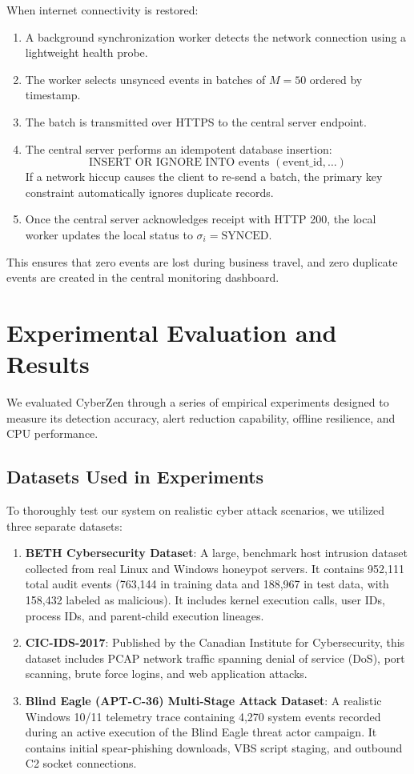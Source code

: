 \documentclass[conference]{IEEEtran}
\begin{document}
When internet connectivity is restored:
\begin{enumerate}
    \item A background synchronization worker detects the network connection using a lightweight health probe.
    \item The worker selects unsynced events in batches of $M=50$ ordered by timestamp.
    \item The batch is transmitted over HTTPS to the central server endpoint.
    \item The central server performs an idempotent database insertion:
    \begin{equation}
    \text{INSERT OR IGNORE INTO events } (\text{event\_id}, \dots)
    \end{equation}
    If a network hiccup causes the client to re-send a batch, the primary key constraint automatically ignores duplicate records.
    \item Once the central server acknowledges receipt with HTTP 200, the local worker updates the local status to $\sigma_i = \text{SYNCED}$.
\end{enumerate}
This ensures that zero events are lost during business travel, and zero duplicate events are created in the central monitoring dashboard.

\section{Experimental Evaluation and Results}
We evaluated CyberZen through a series of empirical experiments designed to measure its detection accuracy, alert reduction capability, offline resilience, and CPU performance.

\subsection{Datasets Used in Experiments}
To thoroughly test our system on realistic cyber attack scenarios, we utilized three separate datasets:
\begin{enumerate}
    \item \textbf{BETH Cybersecurity Dataset}: A large, benchmark host intrusion dataset collected from real Linux and Windows honeypot servers. It contains 952,111 total audit events (763,144 in training data and 188,967 in test data, with 158,432 labeled as malicious). It includes kernel execution calls, user IDs, process IDs, and parent-child execution lineages.
    \item \textbf{CIC-IDS-2017}: Published by the Canadian Institute for Cybersecurity, this dataset includes PCAP network traffic spanning denial of service (DoS), port scanning, brute force logins, and web application attacks.
    \item \textbf{Blind Eagle (APT-C-36) Multi-Stage Attack Dataset}: A realistic Windows 10/11 telemetry trace containing 4,270 system events recorded during an active execution of the Blind Eagle threat actor campaign. It contains initial spear-phishing downloads, VBS script staging, and outbound C2 socket connections.
\end{enumerate}
\end{document}
